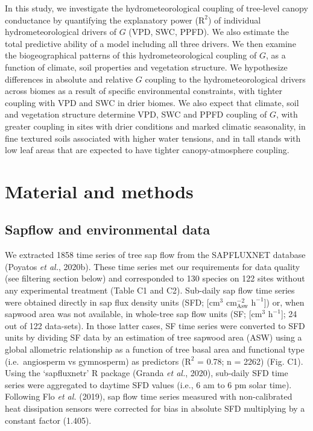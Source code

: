 \documentclass[11pt,twoside]{reedthesis}
\begin{document}
In this study, we investigate the hydrometeorological coupling of
tree-level canopy conductance by quantifying the explanatory power
(\(\text{R}^2\)) of individual hydrometeorological drivers of \(G\)
(VPD, SWC, PPFD). We also estimate the total predictive ability of a
model including all three drivers. We then examine the biogeographical
patterns of this hydrometeorological coupling of \(G\), as a function of
climate, soil properties and vegetation structure. We hypothesize
differences in absolute and relative \(G\) coupling to the
hydrometeorological drivers across biomes as a result of specific
environmental constraints, with tighter coupling with VPD and SWC in
drier biomes. We also expect that climate, soil and vegetation structure
determine VPD, SWC and PPFD coupling of \(G\), with greater coupling in
sites with drier conditions and marked climatic seasonality, in fine
textured soils associated with higher water tensions, and in tall stands
with low leaf areas that are expected to have tighter canopy-atmosphere
coupling.\par

\section{Material and methods}\label{material-and-methods}

\subsection{Sapflow and environmental
data}\label{sapflow-and-environmental-data}

We extracted 1858 time series of tree sap flow from the SAPFLUXNET
database (Poyatos \emph{et al.}, 2020b). These time series met our
requirements for data quality (see filtering section below) and
corresponded to 130 species on 122 sites without any experimental
treatment (Table C1 and C2). Sub-daily sap flow time series were
obtained directly in sap flux density units (SFD; {[}\(\text{cm}^3\)
\(\text{cm}^{-2}_{\text{Asw}}\) \(\text{h}^{-1}\){]}) or, when sapwood
area was not available, in whole-tree sap flow units (SF;
{[}\(\text{cm}^3\) \(\text{h}^{-1}\){]}; 24 out of 122 data-sets). In
those latter cases, SF time series were converted to SFD units by
dividing SF data by an estimation of tree sapwood area (ASW) using a
global allometric relationship as a function of tree basal area and
functional type (i.e.~angiosperm vs gymnosperm) as predictors
(\(\text{R}^2\) = 0.78; n = 2262) (Fig. C1). Using the `sapfluxnetr' R
package (Granda \emph{et al.}, 2020), sub-daily SFD time series were
aggregated to daytime SFD values (i.e., 6 am to 6 pm solar time).
Following Flo \emph{et al.} (2019), sap flow time series measured with
non-calibrated heat dissipation sensors were corrected for bias in
absolute SFD multiplying by a constant factor (1.405).\par
\end{document}
